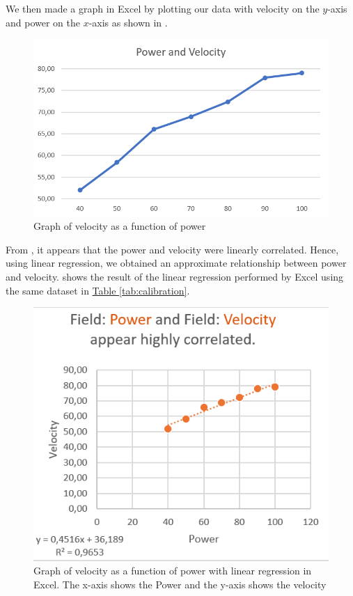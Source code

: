 We then made a graph in Excel by plotting our data with velocity on the $y$-axis and power on the $x$-axis as shown in .

\begin{figure}[h!]
		\centering
	\includegraphics[width=1\linewidth]{figures/velocity_and_power}
	\caption[Graph of velocity as function of power]{Graph of velocity as a function of power}
	\label{fig:graphvelpow}
\end{figure}

From , it appears that the power and velocity were linearly correlated. Hence, using linear regression, we obtained an approximate relationship between power and velocity.  shows the result of the linear regression performed by Excel using the same dataset in \hyperref[tab:calibration]{Table \ref{tab:calibration}}.

\clearpage
\begin{figure}[h!]
	\centering
	\includegraphics[width=1\linewidth]{figures/function_of_power}
	\caption{Graph of velocity as a function of power with linear regression in Excel. The x-axis shows the Power and the y-axis shows the velocity}
	\label{fig:functionofpower}
\end{figure}

